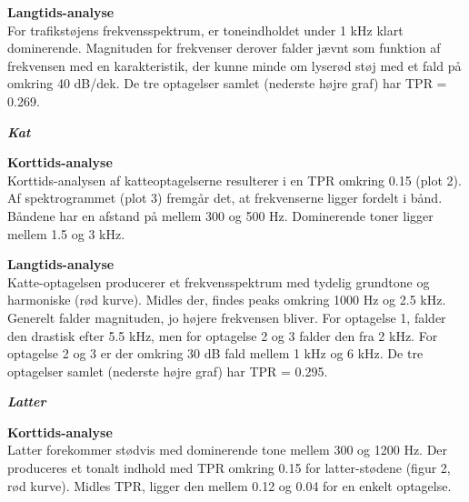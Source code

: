 
\newpage
\textbf{Langtids-analyse} \\
For trafikstøjens frekvensspektrum, er toneindholdet under 1 kHz klart dominerende. Magnituden for frekvenser derover falder jævnt som funktion af frekvensen med en karakteristik, der kunne minde om lyserød støj med et fald på omkring 40 dB/dek. De tre optagelser samlet (nederste højre graf) har TPR = 0.269.


\newpage
\begin{center}\textit{\textbf{Kat}}\end{center}
\textbf{Korttids-analyse} \\
Korttids-analysen af katteoptagelserne resulterer i en TPR omkring 0.15 (plot 2). Af spektrogrammet (plot 3) fremgår det, at frekvenserne ligger fordelt i bånd. Båndene har en afstand på mellem 300 og 500 Hz. Dominerende toner ligger mellem 1.5 og 3 kHz.


\newpage
\textbf{Langtids-analyse} \\
Katte-optagelsen producerer et frekvensspektrum med tydelig grundtone og harmoniske (rød kurve). Midles der, findes peaks omkring 1000 Hz og 2.5 kHz. Generelt falder magnituden, jo højere frekvensen bliver. For optagelse 1, falder den drastisk efter 5.5 kHz, men for optagelse 2 og 3 falder den fra 2 kHz. For optagelse 2 og 3 er der omkring 30 dB fald mellem 1 kHz og 6 kHz. De tre optagelser samlet (nederste højre graf) har TPR = 0.295.


\newpage
\begin{center}\textit{\textbf{Latter}}\end{center}
\textbf{Korttids-analyse} \\
Latter forekommer stødvis med dominerende tone mellem 300 og 1200 Hz. Der produceres et tonalt indhold med TPR omkring 0.15 for latter-stødene (figur 2, rød kurve). Midles TPR, ligger den mellem 0.12 og 0.04 for en enkelt optagelse.

